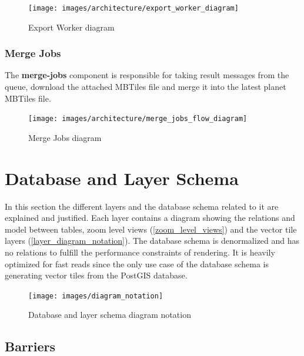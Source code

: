 \begin{figure}[H]
  \centering
  \texttt{[image: images/architecture/export\_worker\_diagram]}
  \caption{Export Worker diagram}
\end{figure}

\subsubsection{Merge Jobs}

The \textbf{merge-jobs} component is responsible for taking result messages from the queue, download the attached MBTiles file and merge it into the latest planet MBTiles file.

\begin{figure}[H]
  \centering
  \texttt{[image: images/architecture/merge\_jobs\_flow\_diagram]}
  \caption{Merge Jobs diagram}
\end{figure}

\section{Database and Layer Schema}\label{database-schema}

In this section the different layers and the database schema related to it are explained and justified. Each layer contains a diagram showing the relations and model between tables, zoom level views (\autoref{zoom_level_views}) and the vector tile layers (\autoref{layer_diagram_notation}).
The database schema is denormalized and has no relations to fulfill the performance constraints of rendering.
It is heavily optimized for fast reads since the only use case of the database schema is generating vector tiles from the PostGIS database.


\begin{figure}[H]
  \centering
  \texttt{[image: images/diagram\_notation]}
  \caption{Database and layer schema diagram notation}
  \label{layer_diagram_notation}
\end{figure}

\subsection{Barriers}

